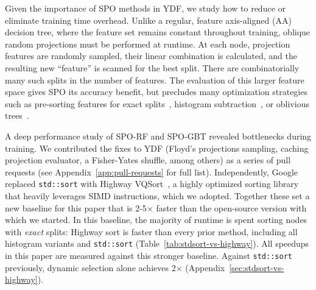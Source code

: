 \documentclass[sigconf]{acmart}%
\begin{document}




Given the importance of SPO methods in YDF, we study how to reduce or eliminate training time overhead. Unlike a regular, feature axis-aligned (AA) decision tree, where the feature set remains constant throughout training, oblique random projections must be performed at runtime. At each node, projection features are randomly sampled, their linear combination is calculated, and the resulting new ``feature'' is scanned for the best split. There are combinatorially many such splits in the number of features. The evaluation of this larger feature space gives SPO its accuracy benefit, but precludes many optimization strategies such as pre-sorting features for exact splits~\cite{ydf,wright2017ranger}, histogram subtraction~\cite{chen2016xgboost,ke2017lightgbm}, or oblivious trees~\cite{prokhorenkova2018catboost}.


A deep performance study of SPO-RF and SPO-GBT revealed bottlenecks during training. We contributed the fixes to YDF (Floyd's projections sampling, caching projection evaluator, a Fisher-Yates shuffle, among others) as a series of pull requests (see Appendix~\ref{app:pull-requests} for full list). Independently, Google replaced \texttt{std::sort} with Highway VQSort~\cite{wassenberg_vectorized_2022}, a highly optimized sorting library that heavily leverages SIMD instructions, which we adopted. Together these set a new baseline for this paper that is 2-5$\times$ faster than the open-source version with which we started. In this baseline, the majority of runtime is spent sorting nodes with {\em exact} splits: Highway sort is faster than every prior method, including all histogram variants and \texttt{std::sort} (Table~\ref{tab:stdsort-vs-highway}). All speedups in this paper are measured against this stronger baseline. Against \texttt{std::sort} previously, dynamic selection alone achieves 2$\times$ (Appendix~\ref{sec:stdsort-vs-highway}). %
\end{document}
